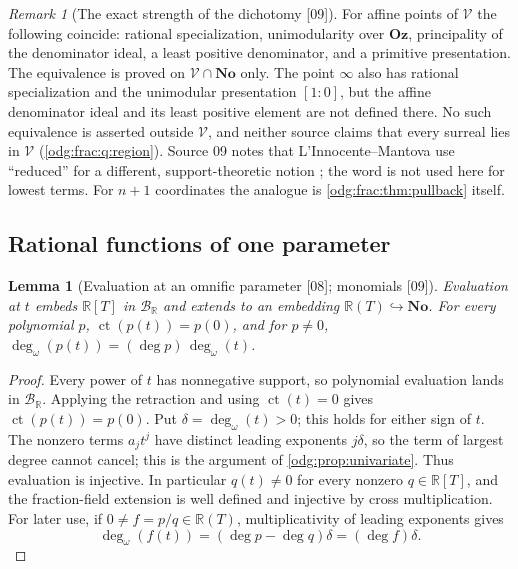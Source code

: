 \documentclass[11pt,oneside]{article}
\numberwithin{equation}{section}
\newtheorem{lemma}[lemma]{Lemma}
\theoremstyle{definition}
\theoremstyle{remark}
\newtheorem{remark}[remark]{Remark}
\newcommand{\No}{\mathbf{No}}
\newcommand{\Oz}{\mathbf{Oz}}
\newcommand{\R}{\mathbb R}
\newcommand{\BR}{\mathcal B_{\R}}
\newcommand{\ct}{\operatorname{ct}}
\newcommand{\ddeg}{\operatorname{deg}_{\omega}}
\newcommand{\src}[1]{\textup{\textsf{\small[#1]}}}
\newcommand{\Vreg}{\mathcal V}
\begin{document}
\begin{remark}[The exact strength of the dichotomy \src{09}]\label{odg:frac:rem:strength}
For affine points of $\Vreg$ the following coincide: rational specialization,
unimodularity over $\Oz$, principality of the denominator ideal, a least
positive denominator, and a primitive presentation. The equivalence is
proved on $\Vreg\cap\No$ only. The point $\infty$ also has rational
specialization and the unimodular presentation $[1:0]$, but the affine
denominator ideal and its least positive element are not defined there.
No such equivalence is asserted outside $\Vreg$, and neither source claims that every
surreal lies in $\Vreg$ (\cref{odg:frac:q:region}). Source 09 notes that
L'Innocente--Mantova use ``reduced'' for a different, support-theoretic notion
\cite{LM}; the word is not used here for lowest terms. For $n+1$ coordinates
the analogue is \cref{odg:frac:thm:pullback} itself.
\end{remark}

\subsection{Rational functions of one parameter}\label{odg:frac:sub:rational}

\begin{lemma}[Evaluation at an omnific parameter \src{08}; monomials \src{09}]\label{odg:frac:lem:evaluation}
Evaluation at $t$ embeds $\R[T]$ in $\BR$ and extends to an embedding
$\R(T)\hookrightarrow\No$. For every polynomial $p$, $\ct(p(t))=p(0)$, and for
$p\ne0$, $\ddeg(p(t))=(\deg p)\,\ddeg(t)$.
\end{lemma}
\begin{proof}
Every power of $t$ has nonnegative support, so polynomial evaluation lands
in $\BR$. Applying the retraction and using $\ct(t)=0$ gives
$\ct(p(t))=p(0)$. Put $\delta=\ddeg(t)>0$; this holds for either sign of $t$.
The nonzero terms $a_jt^j$ have distinct leading exponents $j\delta$, so the
term of largest degree cannot cancel; this is the argument of
\cref{odg:prop:univariate}. Thus evaluation is injective. In particular
$q(t)\ne0$ for every nonzero $q\in\R[T]$, and the fraction-field extension
is well defined and injective by cross multiplication. For later use, if
$0\ne f=p/q\in\R(T)$, multiplicativity of leading exponents gives
\[
 \ddeg(f(t))=(\deg p-\deg q)\delta=(\deg f)\delta.
\]
\end{proof}
\end{document}
